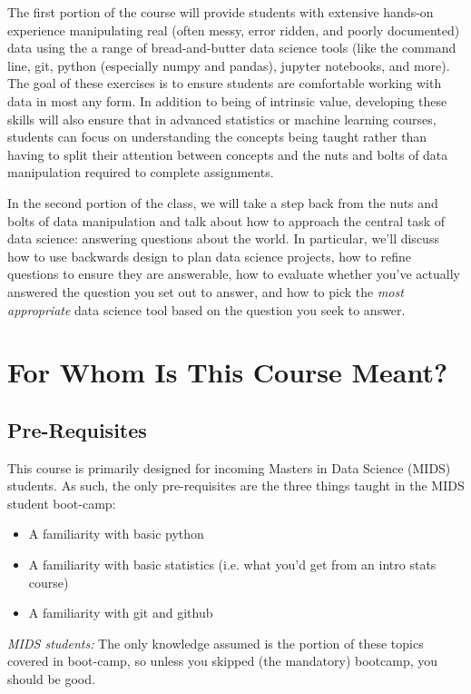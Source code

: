 \documentclass[12pt]{article}
\begin{document}
The first portion of the course will provide students with extensive hands-on experience manipulating real (often messy, error ridden, and poorly documented) data using the a range of bread-and-butter data science tools (like the command line, git, python (especially numpy and pandas), jupyter notebooks, and more). The goal of these exercises is to ensure students are comfortable working with data in most any form. In addition to being of intrinsic value, developing these skills will also ensure that in advanced statistics or machine learning courses, students can focus on understanding the concepts being taught rather than having to split their attention between concepts and the nuts and bolts of data manipulation required to complete assignments.

In the second portion of the class, we will take a step back from the nuts and bolts of data manipulation and talk about how to approach the central task of data science: answering questions about the world. In particular, we'll discuss how to use backwards design to plan data science projects, how to refine questions to ensure they are answerable, how to evaluate whether you've actually answered the question you set out to answer, and how to pick the \emph{most appropriate} data science tool based on the question you seek to answer.


\section{For Whom Is This Course Meant?}

\subsection{Pre-Requisites}

This course is primarily designed for incoming Masters in Data Science (MIDS) students. As such, the only pre-requisites are the three things taught in the MIDS student boot-camp:

\begin{itemize}
	\item A familiarity with basic python
	\item A familiarity with basic statistics (i.e. what you'd get from an intro stats course)
	\item A familiarity with git and github
\end{itemize}

\emph{MIDS students:}
The only knowledge assumed is the portion of these topics covered in boot-camp, so unless you skipped (the mandatory) bootcamp, you should be good.
\end{document}
